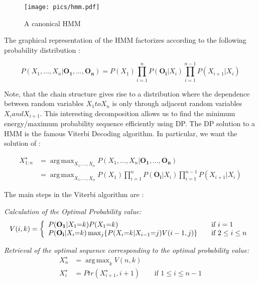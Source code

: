 \documentclass{article}
\DeclareMathOperator*{\argmax}{arg\,max}
\begin{document}
\begin{figure}[h!]
    \centering
    \texttt{[image: pics/hmm.pdf]}
    \caption{A canonical HMM}
    \label{hmm1}
\end{figure}


The graphical representation of the HMM factorizes according to the following probability distribution :

\begin{equation}
P(X_1,\ldots,X_n|\mathbf{O_1},\ldots,\mathbf{O_n}) = P(X_1)\prod_{i=1}^{n}{P(\mathbf{O_i}|X_i)}\prod_{i=1}^{n-1}{P(X_{i+1}|X_i)}
\end{equation}

Note, that the chain structure gives rise to a distribution where the dependence between random variables $X_1 to X_n$ is only through adjacent random variables $X_i and X_{i+1}$. This interesting decomposition allows us to find the minimum energy/maximum probability sequence efficiently using DP. The DP solution to a HMM is the famous Viterbi Decoding algorithm. In particular, we want the solution of :

\begin{align*}
X^\star_{1:n} &= \argmax_{X_1,\ldots ,X_n} P(X_1,\ldots,X_n|\mathbf{O_1},\ldots,\mathbf{O_n})\\
  &= \argmax_{X_1,\ldots ,X_n}P(X_1)\prod_{i=1}^{n}{P(\mathbf{O_i}|X_i)}\prod_{i=1}^{n-1}{P(X_{i+1}|X_i)}
\end{align*}


The main steps in the Viterbi algorithm are : 

\vspace*{0.2in}

\textit{Calculation of the Optimal Probability value:}
\[
  V(i,k) = \left\{
  \begin{array}{l l}
    P(\mathbf{O_1}|X_1{=}k)P(X_1{=}k) & \quad \text{if $i=1$}\\
    P(\mathbf{O_i}|X_i{=}k)\max_{j}\{P(X_{i}{=}k|X_{i-1}{=}j)V(i-1,j)\} & \quad \text{if $2\leq i\leq n$}\\
  \end{array} \right.
\]


\textit{Retrieval of the optimal sequence corresponding to the optimal probability value:}
\begin{align*}
X^\star_n &= \argmax_{k}V(n,k) \\
X^\star_{i} &= Ptr(X^\star_{i+1},i+1) & \quad \text{if $1\leq i \leq n-1 $}
\end{align*}
\end{document}
